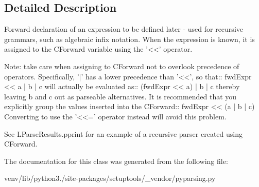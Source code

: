 \subsection{Detailed Description}
\begin{DoxyVerb}Forward declaration of an expression to be defined later -
used for recursive grammars, such as algebraic infix notation.
When the expression is known, it is assigned to the C{Forward} variable using the '<<' operator.

Note: take care when assigning to C{Forward} not to overlook precedence of operators.
Specifically, '|' has a lower precedence than '<<', so that::
    fwdExpr << a | b | c
will actually be evaluated as::
    (fwdExpr << a) | b | c
thereby leaving b and c out as parseable alternatives.  It is recommended that you
explicitly group the values inserted into the C{Forward}::
    fwdExpr << (a | b | c)
Converting to use the '<<=' operator instead will avoid this problem.

See L{ParseResults.pprint} for an example of a recursive parser created using
C{Forward}.
\end{DoxyVerb}
 

The documentation for this class was generated from the following file\+:\begin{DoxyCompactItemize}
\item 
venv/lib/python3./site-\/packages/setuptools/\+\_\+vendor/pyparsing.\+py\end{DoxyCompactItemize}
